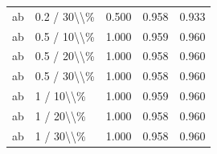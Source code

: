 \begin{table}[!h]
\begin{tabular}[t]{llccc}
\addlinespace
ab & 0.2 / 30\textbackslash{}\textbackslash{}\% & 0.500 & 0.958 & 0.933\\
ab & 0.5 / 10\textbackslash{}\textbackslash{}\% & 1.000 & 0.959 & 0.960\\
ab & 0.5 / 20\textbackslash{}\textbackslash{}\% & 1.000 & 0.958 & 0.960\\
ab & 0.5 / 30\textbackslash{}\textbackslash{}\% & 1.000 & 0.958 & 0.960\\
ab & 1 / 10\textbackslash{}\textbackslash{}\% & 1.000 & 0.959 & 0.960\\
\addlinespace
ab & 1 / 20\textbackslash{}\textbackslash{}\% & 1.000 & 0.958 & 0.960\\
ab & 1 / 30\textbackslash{}\textbackslash{}\% & 1.000 & 0.958 & 0.960\\
\bottomrule
\end{tabular}
\end{table}
